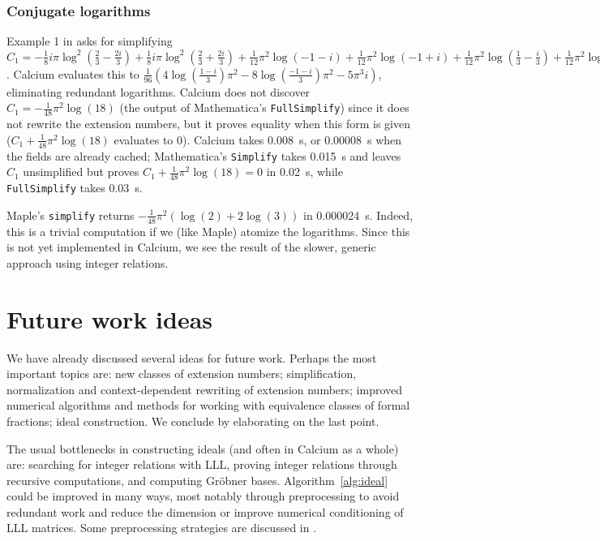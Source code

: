 \documentclass[sigconf,screen,urlbreakonhyphens]{acmart}
\begin{document}
\subsubsection{Conjugate logarithms}

Example 1 in \cite{BBK2014} asks for simplifying $C_1 = -\frac{1}{8} i \pi \log^{2}(\frac{2}{3} - \frac{2 i}{3}) + \frac{1}{8} i \pi \log^{2}(\frac{2}{3} + \frac{2 i}{3}) + \frac{1}{12} {\pi}^{2} \log(-1 - i) + \frac{1}{12} {\pi}^{2} \log(-1 + i) + \frac{1}{12} {\pi}^{2} \log(\frac{1}{3} - \frac{i}{3}) + \frac{1}{12} {\pi}^{2} \log(\frac{1}{3} + \frac{i}{3})$.
Calcium evaluates this to
$\tfrac{1}{96} (4 \log(\frac{1 - i}{3}) {\pi}^{2} - 8 \log(\frac{-1 - i}{3}) {\pi}^{2} - 5 {\pi}^{3} i)$,
eliminating redundant logarithms.
Calcium does not discover $C_1 = -\tfrac{1}{48} \pi^2 \log(18)$ (the output of Mathematica's \texttt{FullSimplify})
since it does not rewrite the extension numbers, but
it proves equality when this form is given ($C_1 + \tfrac{1}{48} \pi^2 \log(18)$ evaluates to 0).
Calcium takes 0.008~s, or 0.00008~s when the fields are already cached;
Mathematica's \texttt{Simplify} takes 0.015~s
and leaves $C_1$ unsimplified but proves $C_1 + \tfrac{1}{48} \pi^2 \log(18) = 0$ in 0.02~s, while \texttt{FullSimplify} takes 0.03~s.

Maple's \texttt{simplify} returns $-\tfrac{1}{48} \pi^2 (\log(2) + 2 \log(3))$ in 0.000024~s.
Indeed, this is a trivial computation if we (like Maple) atomize
the logarithms.
Since this is not yet implemented in Calcium,
we see the result of the slower, generic approach
using integer relations.

\section{Future work ideas}

We have already discussed several ideas for future work.
Perhaps the most important topics are: new classes
of extension numbers;
simplification, normalization and context-dependent
rewriting of extension numbers; improved numerical algorithms
and methods for working with equivalence classes
of formal fractions; ideal construction.
We conclude by elaborating on the last point.

The usual bottlenecks in constructing ideals (and often in Calcium
as a whole) are: searching for integer relations with LLL,
proving integer relations through recursive computations,
and computing Gr\"{o}bner bases.
Algorithm~\ref{alg:ideal} could be improved in many ways,
most notably through preprocessing
to avoid redundant work and
reduce the dimension or improve numerical
conditioning of LLL matrices.
Some preprocessing strategies are discussed in \cite{BBK2014}.
\end{document}
